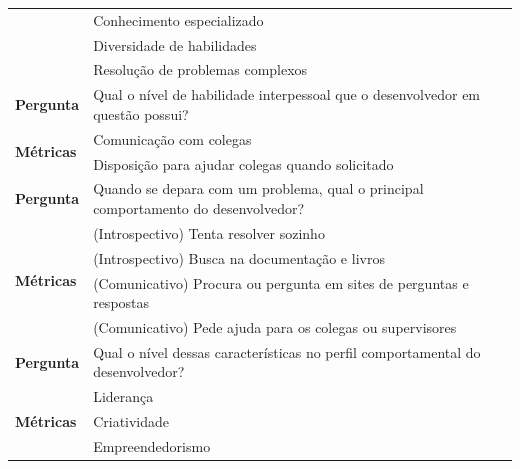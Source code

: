 \begin{table}[h]
\begin{tabular}{|p{2cm}|p{6.25cm}|p{6.25cm}|}
		& \multicolumn{2}{l|}{Conhecimento especializado}                                                         \\ \cline{2-3} 
		& \multicolumn{2}{l|}{Diversidade de habilidades}                                                         \\ \cline{2-3} 
		& \multicolumn{2}{l|}{Resolução de problemas complexos}                                                   \\ \hline\hline
		\textbf{Pergunta}                  & \multicolumn{2}{l|}{\parbox{12cm}{Qual o nível de habilidade interpessoal que o desenvolvedor em questão possui?}}     \\ \hline
		\multirow{2}{*}{\textbf{Métricas}} & \multicolumn{2}{l|}{Comunicação com colegas}                                                            \\ \cline{2-3} 
		& \multicolumn{2}{l|}{Disposição para ajudar colegas quando solicitado}                                   \\ \hline\hline
		\textbf{Pergunta}                  & \multicolumn{2}{l|}{\parbox[c][1cm][c]{12cm}{Quando se depara com um problema, qual o principal comportamento do desenvolvedor?}} \\ \hline
		\multirow{4}{*}{\textbf{Métricas}} & \multicolumn{2}{l|}{(Introspectivo) Tenta resolver sozinho}                                             \\ \cline{2-3} 
		& \multicolumn{2}{l|}{(Introspectivo) Busca na documentação e livros}                                     \\ \cline{2-3} 
		& \multicolumn{2}{l|}{(Comunicativo) Procura ou pergunta em sites de perguntas e respostas}               \\ \cline{2-3} 
		& \multicolumn{2}{l|}{(Comunicativo) Pede ajuda para os colegas ou supervisores}                          \\ \hline\hline
		\textbf{Pergunta}                  & \multicolumn{2}{l|}{\parbox{12cm}{Qual o nível dessas características no perfil comportamental do desenvolvedor?}}     \\ \hline
		\multirow{4}{*}{\textbf{Métricas}} & \multicolumn{2}{l|}{Liderança}                                                                          \\ \cline{2-3} 
		& \multicolumn{2}{l|}{Criatividade}                                                                       \\ \cline{2-3} 
		& \multicolumn{2}{l|}{Empreendedorismo}                                                                   \\ \cline{2-3} 

\end{tabular}
\end{table}
